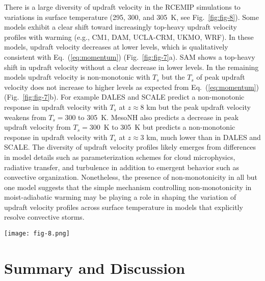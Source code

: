 \documentclass[]{ametsocV6.1}
\begin{document}
There is a large diversity of updraft velocity in the RCEMIP simulations to variations in surface temperature (295, 300, and 305~K, see Fig.~\ref{fig:fig-8}). Some models exhibit a clear shift toward increasingly top-heavy updraft velocity profiles with warming (e.g., CM1, DAM, UCLA-CRM, UKMO, WRF). In these models, updraft velocity decreases at lower levels, which is qualitatively consistent with Eq.~(\ref{eq:momentum}) (Fig.~\ref{fig:fig-7}a). SAM shows a top-heavy shift in updraft velocity without a clear decrease in lower levels. In the remaining models updraft velocity is non-monotonic with $T_s$ but the $T_s$ of peak updraft velocity does not increase to higher levels as expected from Eq.~(\ref{eq:momentum}) (Fig.~\ref{fig:fig-7}b). For example DALES and SCALE predict a non-monotonic response in updraft velocity with $T_s$ at $z\approx8$ km but the peak updraft velocity weakens from $T_s=300$ to 305~K. MesoNH also predicts a decrease in peak updraft velocity from $T_s=300$~K to 305~K but predicts a non-monotonic response in updraft velocity with $T_s$ at $z\approx3$ km, much lower than in DALES and SCALE. The diversity of updraft velocity profiles likely emerges from differences in model details such as parameterization schemes for cloud microphysics, radiative transfer, and turbulence in addition to emergent behavior such as convective organization. Nonetheless, the presence of non-monotonicity in all but one model suggests that the simple mechanism controlling non-monotonicity in moist-adiabatic warming may be playing a role in shaping the variation of updraft velocity profiles across surface temperature in models that explicitly resolve convective storms.

\begin{figure*}[htbp]
 \centering
 \texttt{[image: fig-8.png]}\\
 \caption{Updraft velocity from 9 cloud-resolving models (CM1, DALES, DAM, MesoNH, SAM-CRM, SCALE, UCLA-CRM, UKMO-CASIM, and WRF) that participated in RCEMIP \citep{wing2018}. The simulations are on a 100~km $\times$ 100~km periodic domain for uniform sea surface temperatures set to 295 (blue), 300 (black), and 305~K (red). Updraft velocity at each level is the mean of vertical velocities $w$ that exceed the 99.9th percentile ($w_{>99.9}$, defined separately for each model).}\label{fig:fig-8}
\end{figure*}

\section{Summary and Discussion}
\end{document}
